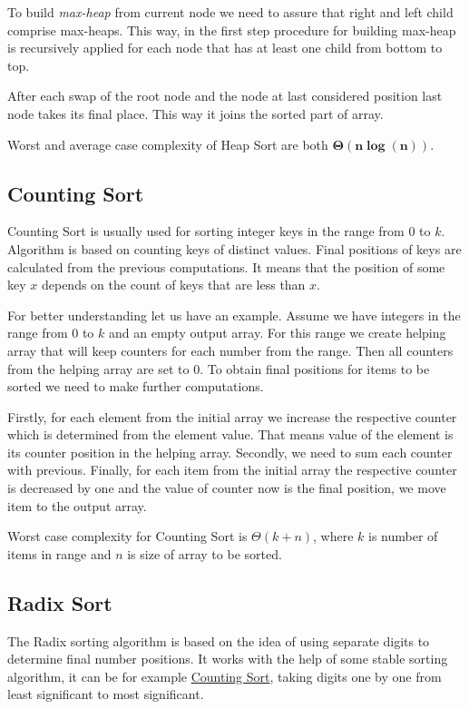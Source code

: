 \documentclass[
  field=inf,
  biblatex,
  language=english,
  glossaries,
  theorems=false,
  index
]{kidiplom}
\begin{document}
To build \textit{max-heap} from current node we need to assure that right and left child comprise max-heaps. This way, in the first step procedure for building max-heap is recursively applied for each node that has at least one child from bottom to top.

After each swap of the root node and the node at last considered position last node takes its final place. This way it joins the sorted part of array.

Worst and average case complexity of Heap Sort are both $\bm{\Theta(n \log(n))}$.

\subsection{Counting Sort} \label{sec:counting}

Counting Sort is usually used for sorting integer keys in the range from $0$ to $k$. Algorithm is based on counting keys of distinct values. Final positions of keys are calculated from the previous computations. It means that the position of some key $x$ depends on the count of keys that are less than $x$.

For better understanding let us have an example. Assume we have integers in the range from $0$ to $k$ and an empty output array. For this range we create helping array that will keep counters for each number from the range. Then all counters from the helping array are set to $0$. To obtain final positions for items to be sorted we need to make further computations.

Firstly, for each element from the initial array we increase the respective counter which is determined from the element value. That means value of the element is its counter position in the helping array. Secondly, we need to sum each counter with previous. Finally, for each item from the initial array the respective counter is decreased by one and the value of counter now is the final position, we move item to the output array.

Worst case complexity for Counting Sort is $\Theta(k + n)$, where $k$ is number of items in range and $n$ is size of array to be sorted.

\subsection{Radix Sort}

The Radix sorting algorithm is based on the idea of using separate digits to determine final number positions. It works with the help of some stable sorting algorithm, it can be for example \hyperref[sec:counting]{Counting Sort}, taking digits one by one from least significant to most significant.
\end{document}
